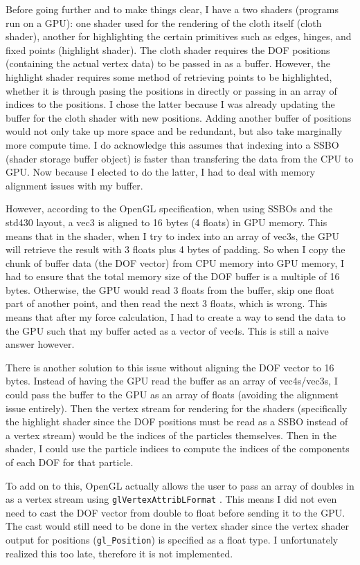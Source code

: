 \documentclass[letterpaper, 10 pt, conference]{ieeeconf}  %
\begin{document}
        Before going further and to make things clear, I have a two shaders (programs run on a GPU): one shader used for the rendering of the cloth itself (cloth shader), another for highlighting the certain primitives such as edges, hinges, and fixed points (highlight shader). The cloth shader requires the DOF positions (containing the actual vertex data) to be passed in as a buffer. However, the highlight shader requires some method of retrieving points to be highlighted, whether it is through pasing the positions in directly or passing in an array of indices to the positions. I chose the latter because I was already updating the buffer for the cloth shader with new positions. Adding another buffer of positions would not only take up more space and be redundant, but also take marginally more compute time. I do acknowledge this assumes that indexing into a SSBO (shader storage buffer object) is faster than transfering the data from the CPU to GPU. Now because I elected to do the latter, I had to deal with memory alignment issues with my buffer. 

        However, according to the OpenGL specification, when using SSBOs and the std430 layout, a vec3 is aligned to 16 bytes (4 floats) in GPU memory. This means that in the shader, when I try to index into an array of vec3s, the GPU will retrieve the result with 3 floats plus 4 bytes of padding. So when I copy the chunk of buffer data (the DOF vector) from CPU memory into GPU memory, I had to ensure that the total memory size of the DOF buffer is a multiple of 16 bytes. Otherwise, the GPU would read 3 floats from the buffer, skip one float part of another point, and then read the next 3 floats, which is wrong. This means that after my force calculation, I had to create a way to send the data to the GPU such that my buffer acted as a vector of vec4s. This is still a naive answer however. 

        There is another solution to this issue without aligning the DOF vector to 16 bytes. Instead of having the GPU read the buffer as an array of vec4s/vec3s, I could pass the buffer to the GPU as an array of floats (avoiding the alignment issue entirely). Then the vertex stream for rendering for the shaders (specifically the highlight shader since the DOF positions must be read as a SSBO instead of a vertex stream) would be the indices of the particles themselves. Then in the shader, I could use the particle indices to compute the indices of the components of each DOF for that particle. 

        To add on to this, OpenGL actually allows the user to pass an array of doubles in as a vertex stream using \texttt{glVertexAttribLFormat} \cite{opengl_documentation} . This means I did not even need to cast the DOF vector from double to float before sending it to the GPU. The cast would still need to be done in the vertex shader since the vertex shader output for positions (\texttt{gl\_Position}) is specified as a float type. I unfortunately realized this too late, therefore it is not implemented. 
\end{document}
